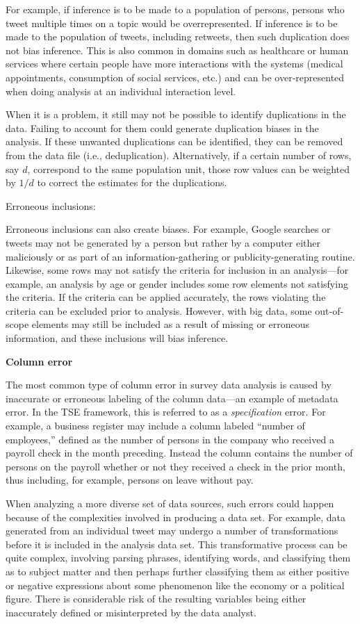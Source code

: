 \documentclass[]{krantz}
\begin{document}
For example, if inference is to be made to a population of persons,
persons who tweet multiple times on a topic would be overrepresented. If
inference is to be made to the population of tweets, including retweets,
then such duplication does not bias inference. This is also common in
domains such as healthcare or human services where certain people have
more interactions with the systems (medical appointments, consumption of
social services, etc.) and can be over-represented when doing analysis
at an individual interaction level.

When it is a problem, it still may not be possible to identify
duplications in the data. Failing to account for them could generate
duplication biases in the analysis. If these unwanted duplications can
be identified, they can be removed from the data file (i.e.,
deduplication). Alternatively, if a certain number of rows, say \(d\),
correspond to the same population unit, those row values can be weighted
by \(1/d\) to correct the estimates for the duplications.

Erroneous inclusions:

Erroneous inclusions can also create biases. For example, Google
searches or tweets may not be generated by a person but rather by a
computer either maliciously or as part of an information-gathering or
publicity-generating routine. Likewise, some rows may not satisfy the
criteria for inclusion in an analysis---for example, an analysis by age
or gender includes some row elements not satisfying the criteria. If the
criteria can be applied accurately, the rows violating the criteria can
be excluded prior to analysis. However, with big data, some out-of-scope
elements may still be included as a result of missing or erroneous
information, and these inclusions will bias inference.

\textbf{Column error}

The most common type of column error in survey data analysis is caused
by inaccurate or erroneous labeling of the column data---an example of
metadata error. In the TSE framework, this is referred to as a
\emph{specification} error. For example, a business register may include
a column labeled ``number of employees,'' defined as the number of
persons in the company who received a payroll check in the month
preceding. Instead the column contains the number of persons on the
payroll whether or not they received a check in the prior month, thus
including, for example, persons on leave without pay.

When analyzing a more diverse set of data sources, such errors could
happen because of the complexities involved in producing a data set. For
example, data generated from an individual tweet may undergo a number of
transformations before it is included in the analysis data set. This
transformative process can be quite complex, involving parsing phrases,
identifying words, and classifying them as to subject matter and then
perhaps further classifying them as either positive or negative
expressions about some phenomenon like the economy or a political
figure. There is considerable risk of the resulting variables being
either inaccurately defined or misinterpreted by the data analyst.
\end{document}
